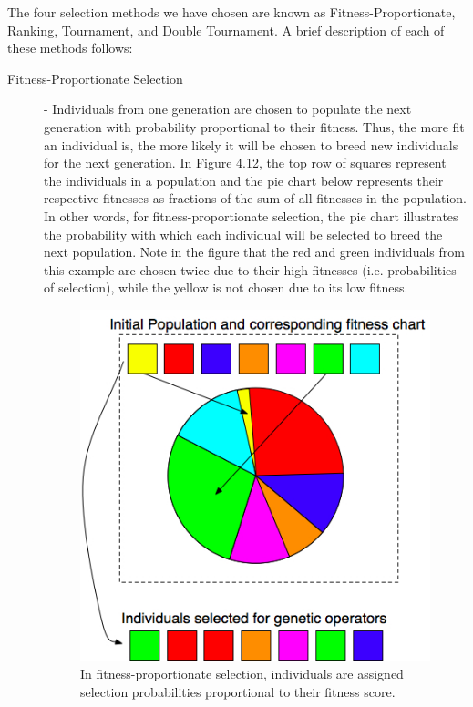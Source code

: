 \documentclass[12pt]{report} 	%
\numberwithin{figure}{chapter}
\numberwithin{table}{chapter}
\numberwithin{equation}{chapter}
\begin{document}
\begin{flushleft}
The four selection methods we have chosen are known as Fitness-Proportionate, Ranking, Tournament, and Double Tournament. A brief description of each of these methods follows:
\begin{description}
\item [Fitness-Proportionate Selection] - Individuals from one generation are chosen to populate the next generation with probability proportional to their fitness. Thus, the more fit an individual is, the more likely it will be chosen to breed new individuals for the next generation. In Figure 4.12, the top row of squares represent the individuals in a population and the pie chart below represents their respective fitnesses as fractions of the sum of all fitnesses in the population. In other words, for fitness-proportionate selection, the pie chart illustrates the probability with which each individual will be selected to breed the next population. Note in the figure that the red and green individuals from this example are chosen twice due to their high fitnesses (i.e. probabilities of selection), while the yellow is not chosen due to its low fitness.
\begin{figure}[h!]
\begin{center}
\includegraphics[scale = 0.7]{PieChartSelection}
\caption[Fitness-proportionate selection]{In fitness-proportionate selection, individuals are assigned selection probabilities proportional to their fitness score.}
\end{center}
\end{figure}

\end{description}
\end{flushleft}
\end{document}
